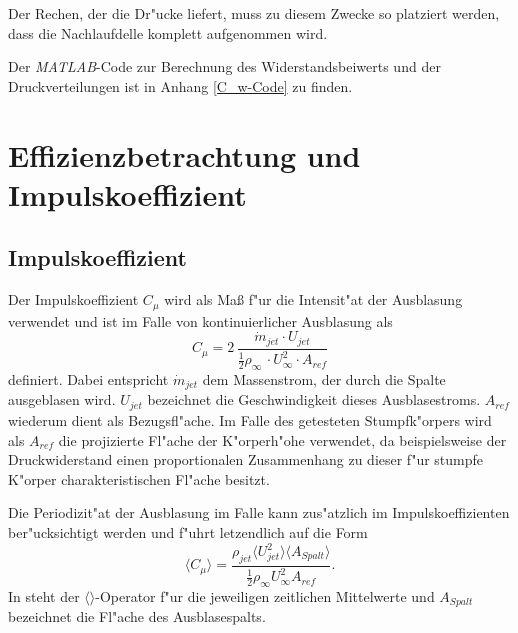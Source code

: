 Der Rechen, der die Dr"ucke liefert, muss zu diesem Zwecke so platziert werden, dass die Nachlaufdelle komplett aufgenommen wird. 

%
%	

Der \textit{MATLAB}-Code zur Berechnung des Widerstandsbeiwerts und der Druckverteilungen ist in Anhang \ref{C_w-Code} zu finden. 

\section{Effizienzbetrachtung und Impulskoeffizient}

\subsection{Impulskoeffizient}
Der Impulskoeffizient $C_{\mu}$ wird als Ma\ss{} f"ur die Intensit"at der Ausblasung verwendet und ist im Falle von kontinuierlicher Ausblasung als 
\begin{equation}
	\label{eq: Def-momentum-coeff}
	C_{\mu} = 2 \,\frac{\dot{m}_{jet} \cdot U_{jet}}{\frac{1}{2}\rho_{\infty}\, \cdot U^2_{\infty} \cdot A_{ref}}
\end{equation}
definiert\cite{ElSayedM..2018}.
Dabei entspricht $\dot{m}_{jet}$ dem Massenstrom, der durch die Spalte ausgeblasen wird. $U_{jet}$ bezeichnet die Geschwindigkeit dieses Ausblasestroms.
$A_{ref}$ wiederum dient als Bezugsfl"ache. Im Falle des getesteten Stumpfk"orpers wird als $A_{ref}$ die projizierte Fl"ache der K"orperh"ohe verwendet, da beispielsweise der Druckwiderstand einen proportionalen Zusammenhang zu dieser f"ur stumpfe K"orper charakteristischen Fl"ache besitzt.  %

Die Periodizit"at der Ausblasung im Falle kann zus"atzlich im Impulskoeffizienten ber"ucksichtigt werden und f"uhrt letzendlich auf die Form \cite{Chabert.2014}
\begin{equation}
	\label{eq:momentum-coeff-oscill}
	\langle{C_{\mu}}\rangle = \frac{\rho_{jet}\langle{U^2_{jet}}\rangle \langle{A_{Spalt}}\rangle} {\frac{1}{2}\rho_{\infty}U^2_{\infty}A_{ref}}.	
\end{equation}
In  steht der $\langle{}\rangle$-Operator f"ur die jeweiligen zeitlichen Mittelwerte und $A_{Spalt}$ bezeichnet die Fl"ache des Ausblasespalts.

